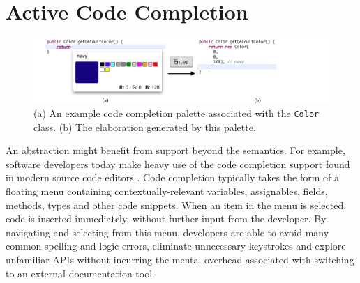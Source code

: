 \newpage
\section{Active Code Completion}\label{acc}
\begin{figure}[h]\label{color}
\begin{center}
\includegraphics[width=40pc]{color_palette.png}\end{center}
\caption{(a) An example code completion palette associated with the \texttt{Color} class. (b) The elaboration generated by this palette.}
\label{colorpalette}
\end{figure}


An abstraction might benefit from support beyond the semantics. For example, software developers today make heavy use of the code completion support found in modern source code editors  \cite{murphy_how_2006}. Code completion typically takes the form of a floating menu containing  contextually-relevant variables, assignables, fields, methods, types and other code snippets. When an item in the menu is selected, code is inserted immediately, without further input from the developer.  By navigating and selecting from this menu, developers are able to avoid many common spelling and logic errors, eliminate unnecessary keystrokes and explore unfamiliar APIs without incurring the mental overhead associated with switching to an external documentation tool.


